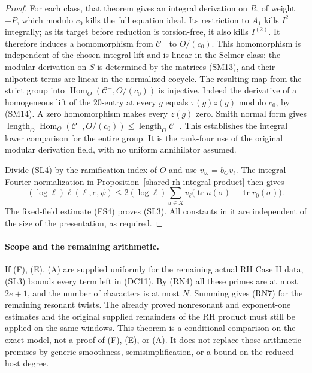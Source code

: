 \begin{proof}
For each class, that theorem gives an integral
derivation on \(R\), of weight \(-P\), which modulo
\(c_0\) kills the full equation ideal. Its restriction
to \(A_1\) kills \(I^2\) integrally; as its target
before reduction is torsion-free, it also kills
\(I^{(2)}\).
It therefore induces a homomorphism from
\(\mathcal C^-\) to \(O/(c_0)\).
This homomorphism is independent of the chosen
integral lift and is linear in the Selmer class:
the modular derivation on \(S\) is determined by
the matrices (SM13), and their nilpotent terms
are linear in the normalized cocycle.
The resulting map from the strict group into
\(\operatorname{Hom}_O(\mathcal C^-,O/(c_0))\)
is injective. Indeed the derivative of a homogeneous
lift of the \(20\)-entry at every \(g\) equals
\(\tau(g)z(g)\) modulo \(c_0\), by (SM14).
A zero homomorphism makes every \(z(g)\) zero.
Smith normal form gives
\(\operatorname{length}_O\operatorname{Hom}_O
(\mathcal C^-,O/(c_0))\le
\operatorname{length}_O\mathcal C^-\).
This establishes the integral lower comparison for
the entire group. It is the rank-four use of the
original modular derivation field, with no uniform
annihilator assumed.

Divide (SL4) by the ramification index of \(O\)
and use \(v_\varpi=b_Ov_\ell\).
The integral Fourier normalization in
Proposition~\ref{shared-rh-integral-product}
then gives
\[
 (\log\ell)\ell(\ell,e,\psi)
 \le2(\log\ell)\sum_{u\in X}
    v_\ell\big(\operatorname{tr}u(\sigma)
                            -\operatorname{tr}r_0(\sigma)\big).
\]
The fixed-field estimate (FS4) proves (SL3).
All constants in it are independent of the size
of the presentation, as required.
\end{proof}

\paragraph{Scope and the remaining arithmetic.}
If (F), (E), (A) are supplied uniformly for the
remaining actual RH Case II data, (SL3) bounds every
term left in (DC11). By (RN4) all these primes are
at most \(2e+1\), and the number of characters is
at most \(N\). Summing gives (RN7) for the remaining
resonant twists. The already proved nonresonant and
exponent-one estimates and the original supplied
remainders of the RH product must still be applied
on the same windows. This theorem is a conditional
comparison on the exact model, not a proof of (F),
(E), or (A). It does not replace those arithmetic
premises by generic smoothness, semisimplification,
or a bound on the reduced host degree.
